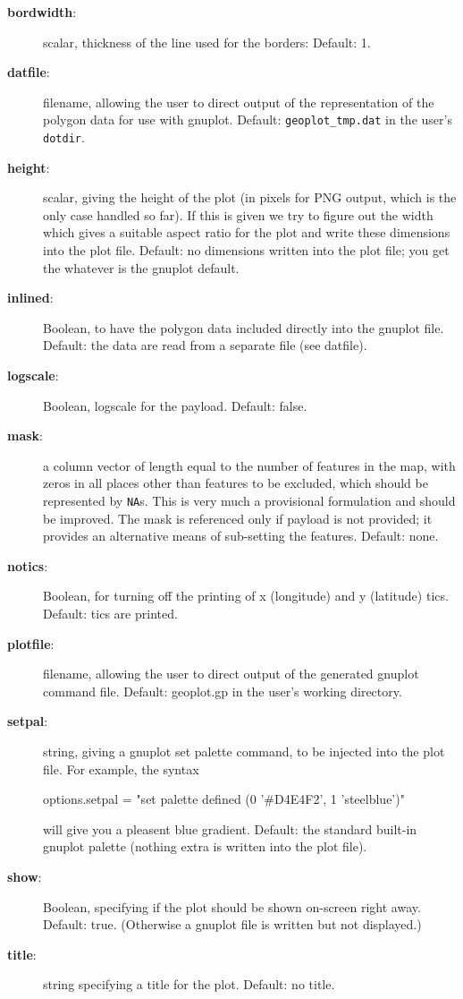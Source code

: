 \documentclass{article}
\begin{document}
\begin{description}
\item[\textbf{bordwidth}:] scalar, thickness of the line used for the
  borders: Default: 1.
\item[\textbf{datfile}:] filename, allowing the user to direct output
  of the representation of the polygon data for use with
  gnuplot. Default: \texttt{geoplot\_tmp.dat} in the user’s
  \texttt{dotdir}.
\item[\textbf{height}:] scalar, giving the height of the plot (in
  pixels for PNG output, which is the only case handled so far). If
  this is given we try to figure out the width which gives a suitable
  aspect ratio for the plot and write these dimensions into the plot
  file. Default: no dimensions written into the plot file; you get the
  whatever is the gnuplot default.
\item[\textbf{inlined}:] Boolean, to have the polygon data included
  directly into the gnuplot file. Default: the data are read from a
  separate file (see datfile).
\item[\textbf{logscale}:] Boolean, logscale for the payload. Default: false.
\item[\textbf{mask}:] a column vector of length equal to the number of
  features in the map, with zeros in all places other than features to
  be excluded, which should be represented by \texttt{NA}s. This is
  very much a provisional formulation and should be improved. The mask
  is referenced only if payload is not provided; it provides an
  alternative means of sub-setting the features. Default: none.
\item[\textbf{notics}:] Boolean, for turning off the printing of x
  (longitude) and y (latitude) tics. Default: tics are printed.
\item[\textbf{plotfile}:] filename, allowing the user to direct output
  of the generated gnuplot command file. Default: geoplot.gp in the
  user’s working directory.
\item[\textbf{setpal}:] string, giving a gnuplot set palette command,
  to be injected into the plot file. For example, the syntax
  \begin{code}
    options.setpal = "set palette defined (0 '#D4E4F2', 1 'steelblue')"  
  \end{code}
  will give you a pleasent blue gradient.  Default: the standard
  built-in gnuplot palette (nothing extra is written into the plot
  file).
\item[\textbf{show}:] Boolean, specifying if the plot should be shown
  on-screen right away. Default: true. (Otherwise a gnuplot file is
  written but not displayed.)
\item[\textbf{title}:] string specifying a title for the
  plot. Default: no title.
\end{description}
\end{document}
